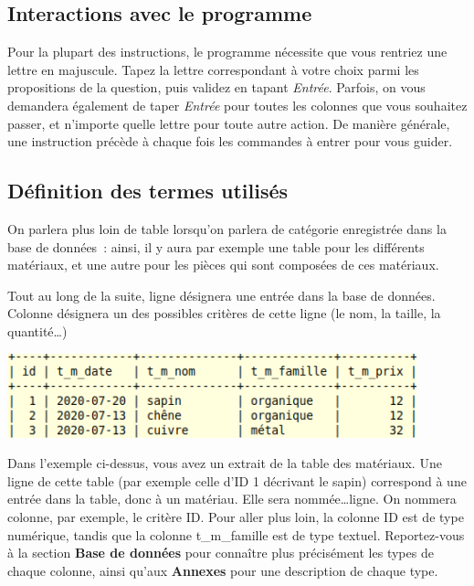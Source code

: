 \documentclass[12pt,a4paper]{article}
\begin{document}
    
    \bigskip
    \subsection{Interactions avec le programme}
        Pour la plupart des instructions, le programme nécessite que vous rentriez une lettre en majuscule.
        Tapez la lettre correspondant à votre choix parmi les propositions de la question,
        puis validez en tapant \emph{Entrée}.
        Parfois, on vous demandera également de taper \emph{Entrée} pour toutes les colonnes que vous
        souhaitez passer, et n'importe quelle lettre pour toute autre action.
        De manière générale, une instruction précède à chaque fois les commandes à entrer
        pour vous guider.
    
    
    \bigskip    
    \subsection{Définition des termes utilisés}
        On parlera plus loin de table lorsqu'on parlera de catégorie enregistrée dans la base de données :
        ainsi, il y aura par exemple une table pour les différents matériaux, et une autre pour les pièces
        qui sont composées de ces matériaux.
    
        Tout au long de la suite, ligne désignera une entrée dans la base de données.
        Colonne désignera un des possibles critères de cette ligne (le nom, la taille, la quantité\dots)
        
        \includegraphics{exemple_lignes_colonnes.png}
    
        Dans l'exemple ci-dessus, vous avez un extrait de la table des matériaux.
        Une ligne de cette table (par exemple celle d'ID 1 décrivant le sapin) correspond à une entrée
        dans la table, donc à un matériau. Elle sera nommée\dots ligne.
        On nommera colonne, par exemple, le critère ID. Pour aller plus loin, la colonne ID
        est de type numérique, tandis que la colonne t\_m\_famille est de type textuel.
        Reportez-vous à la section \textbf{Base de données} pour connaître plus précisément
        les types de chaque colonne, ainsi qu'aux \textbf{Annexes} pour une description
        de chaque type.
    
\end{document}

